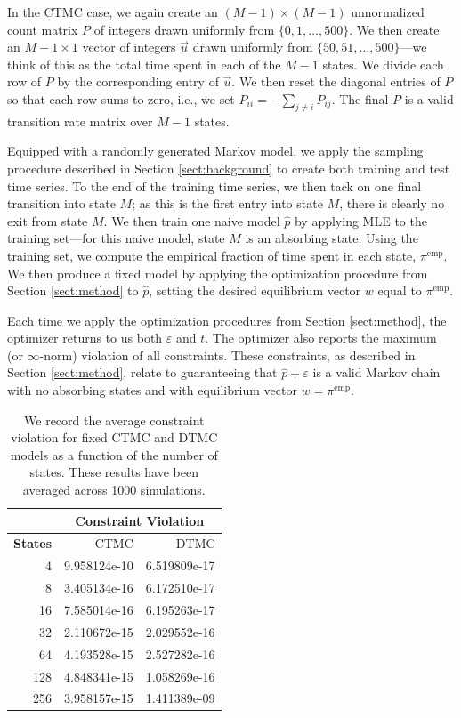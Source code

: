 \documentclass[review,letterpaper,11pt]{elsarticle}
\begin{document}
In the CTMC case, we again create an $(M-1) \times (M-1)$ unnormalized count matrix $P$ of integers drawn uniformly from $\{0, 1, \ldots, 500\}$.   We then create an $M-1 \times 1$ vector of integers $\vec{u}$ drawn uniformly from $\{50, 51, \ldots, 500\}$---we think of this as the total time spent in each of the $M-1$ states.  We divide each row of $P$ by the corresponding entry of $\vec{u}$.  We then reset the diagonal entries of $P$ so that each row sums to zero, i.e., we set $P_{ii} = -\sum_{j \neq i} P_{ij}$.  The final $P$ is a valid transition rate matrix over $M-1$ states.

Equipped with a randomly generated Markov model, we apply the sampling procedure described in Section \ref{sect:background} to create both training and test time series.  To the end of the training time series, we then tack on one final transition into state $M$; as this is the first entry into state $M$, there is clearly no exit from state $M$.  We then train one naive model $\widehat{p}$ by applying MLE to the training set---for this naive model, state $M$ is an absorbing state.  Using the training set, we compute the empirical fraction of time spent in each state, $\pi^\text{emp}$.  We then produce a fixed model by applying the optimization procedure from Section \ref{sect:method} to $\widehat{p}$, setting the desired equilibrium vector $w$ equal to $\pi^\text{emp}$.

Each time we apply the optimization procedures from Section \ref{sect:method}, the optimizer returns to us both $\varepsilon$ and $t$.  The optimizer also reports the maximum (or $\infty$-norm) violation of all constraints.  These constraints, as described in Section \ref{sect:method}, relate to guaranteeing that $\widehat{p} + \varepsilon$ is a valid Markov chain with no absorbing states and with equilibrium vector $w = \pi^\text{emp}$.  

\begin{table}[bt]
\centering
\begin{tabular}{rrr}
	\toprule
	& \multicolumn{2}{c}{\textbf{Constraint Violation}} \\
	\midrule
	\textbf{States} &    CTMC           &    DTMC           \\
	4           &  9.958124e-10 &  6.519809e-17 \\
	8           &  3.405134e-16 &  6.172510e-17 \\
	16          &  7.585014e-16 &  6.195263e-17 \\
	32          &  2.110672e-15 &  2.029552e-16 \\
	64          &  4.193528e-15 &  2.527282e-16 \\
	128         &  4.848341e-15 &  1.058269e-16 \\
	256         &  3.958157e-15 &  1.411389e-09 \\
	\bottomrule
\end{tabular}
	\caption{We record the average constraint violation for fixed CTMC and DTMC models as a function of the number of states.  These results have been averaged across 1000 simulations.}
	\label{tab:constrviol}
\end{table}
\end{document}
